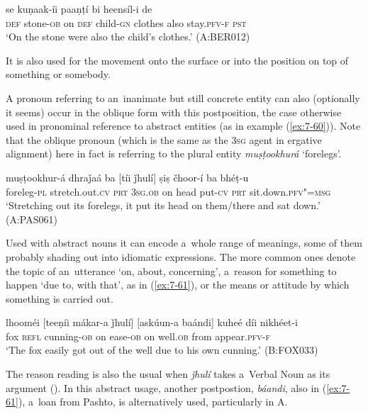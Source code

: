 \begin{exe}
\ex
\label{ex:7-59}
 se kuṇaak-íi paaṇṭí bi heensíl-i de \\
\textsc{def} stone-\textsc{ob} on \textsc{def}  child-\textsc{gn}  clothes also  stay.\textsc{pfv-f} \textsc{pst } \\
\glt `On the stone were also the child's clothes.' (A:BER012)
\end{exe}

It is also used for the movement onto the surface or into the position on top of something or somebody.


A pronoun referring to an~inanimate but still concrete entity can also (optionally it seems) occur in the oblique form with this postposition, the case otherwise used in pronominal reference to abstract entities (as in example (\ref{ex:7-60})). Note that the oblique pronoun (which is the same as the \textsc{3sg} agent in ergative alignment) here in fact is referring to the plural entity \textit{muṣṭookhurá} `forelegs'.

\begin{exe}
\ex
\label{ex:7-60}
\gll muṣṭookhur-á dhraǰaá ba [tíi ǰhulí] ṣiṣ čhoor-í ba bhéṭ-u\\
foreleg-\textsc{pl} stretch.out.\textsc{cv} \textsc{prt} \textsc{3sg.ob} on head put-\textsc{cv} \textsc{prt} sit.down.\textsc{pfv"=msg}\\
\glt `Stretching out its forelegs, it put its head on them/there and sat down.' (A:PAS061)
\end{exe}

Used with abstract nouns it can encode a~whole range of meanings, some of them probably shading out into idiomatic expressions. The more common ones denote the topic of an~utterance `on, about, concerning', a~reason for something to happen `due to, with that', as in (\ref{ex:7-61}), or the means or attitude by which something is carried out.

\begin{exe}
\ex
\label{ex:7-61}
\gll lhooméi [teeṇíi mákar-a ǰhulí] [askúun-a baándi] kuheé díi nikhéet-i\\
fox \textsc{refl} cunning-\textsc{ob} on ease-\textsc{ob}  on well.\textsc{ob} from appear.\textsc{pfv-f} \\
\glt `The fox easily got out of the well due to his own cunning.' (B:FOX033)
\end{exe}

The reason reading is also the usual when \textit{ǰhulí} takes a~Verbal Noun as its argument (). In this abstract usage, another postpostion, \textit{báandi}, also in (\ref{ex:7-61}), a~loan from Pashto, is alternatively used, particularly in A.


